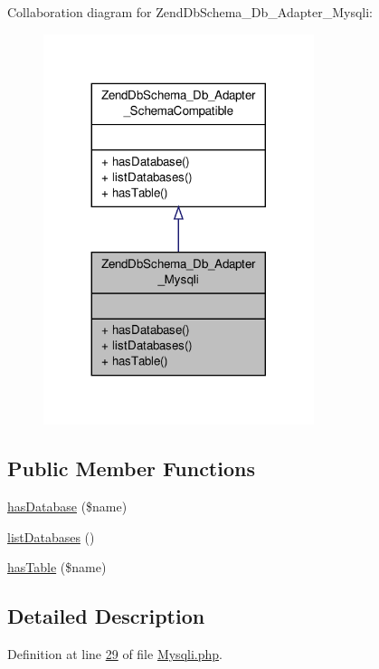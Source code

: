 Collaboration diagram for Zend\-Db\-Schema\-\_\-\-Db\-\_\-\-Adapter\-\_\-\-Mysqli\-:\nopagebreak
\begin{figure}[H]
\begin{center}
\leavevmode
\includegraphics[width=224pt]{classZendDbSchema__Db__Adapter__Mysqli__coll__graph}
\end{center}
\end{figure}
\subsection*{Public Member Functions}
\begin{DoxyCompactItemize}
\item 
\hyperlink{classZendDbSchema__Db__Adapter__Mysqli_a6ccb0e30dd7c6eae3e91079f1f978444}{has\-Database} (\$name)
\item 
\hyperlink{classZendDbSchema__Db__Adapter__Mysqli_abc74258342f5cd4b637feb4561b6ab37}{list\-Databases} ()
\item 
\hyperlink{classZendDbSchema__Db__Adapter__Mysqli_a15fe5991fb07fff863ea1bde93baca0a}{has\-Table} (\$name)
\end{DoxyCompactItemize}


\subsection{Detailed Description}


Definition at line \hyperlink{Mysqli_8php_source_l00029}{29} of file \hyperlink{Mysqli_8php_source}{Mysqli.\-php}.



